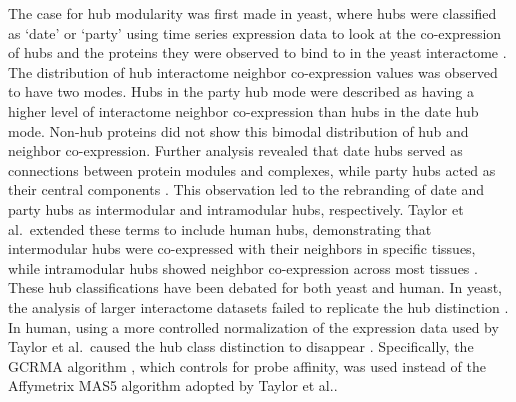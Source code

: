 The case for hub modularity was first made in yeast, where hubs were
classified as `date' or `party' using time series expression data to
look at the co-expression of hubs and the proteins they were observed
to bind to in the yeast interactome \cite{han04}. The distribution of
hub interactome neighbor co-expression values was observed to have two
modes. Hubs in the party hub mode were described as having a higher
level of interactome neighbor co-expression than hubs in the date hub
mode. Non-hub proteins did not show this bimodal distribution of hub
and neighbor co-expression. Further analysis revealed that date hubs
served as connections between protein modules and complexes, while
party hubs acted as their central components \cite{fraser05}. This
observation led to the rebranding of date and party hubs as
intermodular and intramodular hubs, respectively. Taylor et
al.\ extended these terms to include human hubs, demonstrating that
intermodular hubs were co-expressed with their neighbors in specific
tissues, while intramodular hubs showed neighbor co-expression across
most tissues \cite{taylor09}. These hub classifications have been
debated for both yeast and human. In yeast, the analysis of larger
interactome datasets failed to replicate the hub distinction
\cite{batada06,batada07}. In human, using a more controlled
normalization of the expression data used by Taylor et al.\ caused the
hub class distinction to disappear \cite{agarwal09}. Specifically, the
GCRMA algorithm \cite{wu2004model}, which controls for probe affinity,
was used instead of the Affymetrix MAS5 algorithm
\cite{hubbell2002robust} adopted by Taylor et al..

